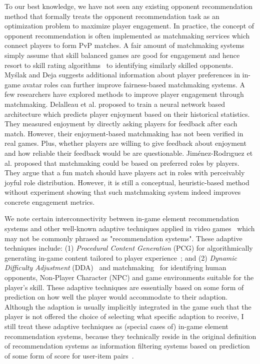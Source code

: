 To our best knowledge, we have not seen any existing opponent recommendation method that formally treats the opponent recommendation task as an optimization problem to maximize player engagement. In practice, the concept of opponent recommendation is often implemented as matchmaking services which connect players to form PvP matches. A fair amount of matchmaking systems simply assume that skill balanced games are good for engagement \cite{graepel2006ranking,sweetser2005gameflow,flow1990psychology,chen2007flow} and hence resort to skill rating algorithms~\cite{glickman1999parameter,elo1978rating,herbrich:trueskill} to identifying similarly skilled opponents. My\'{s}lak and Deja \cite{myslak2014developing} suggests additional information about player preferences in in-game avatar roles can further improve fairness-based matchmaking systems. A few researchers have explored methods to improve player engagement through matchmaking. Delalleau et al. \cite{Delalleau2012} proposed to train a neural network based architecture which predicts player enjoyment based on their historical statistics. They measured enjoyment by directly asking players for feedback after each match. However, their enjoyment-based matchmaking has not been verified in real games. Plus, whether players are willing to give feedback about enjoyment and how reliable their feedback would be are questionable. Jim{\'e}nez-Rodr{\i}guez et al. \cite{jimenez2011matchmaking} proposed that matchmaking could be based on preferred roles by players. They argue that a fun match should have players act in  roles with perceivably joyful role distribution. However, it is still a conceptual, heuristic-based method without experiment showing that such matchmaking system indeed improves concrete engagement metrics.

We note certain interconnectivity between in-game element recommendation systems and other well-known adaptive techniques applied in video games~\cite{bakkes2012personalised,chen2015analytics} which may not be commonly phrased as "recommendation systems". These adaptive techniques include: (1) \textit{Procedural Content Generation} (PCG) for algorithmically generating in-game content tailored to player experience~\cite{yannakakis2011experience,togelius2011search}; and (2) \textit{Dynamic Difficulty Adjustment} (DDA)~\cite{hunicke2005case} and matchmaking~\cite{Delalleau2012,herbrich:trueskill} for identifying human opponents, Non-Player Character (NPC) and game environments suitable for the player's skill. These adaptive techniques are essentially based on some form of prediction on how well the player would accommodate to their adaption. Although the adaption is usually implicitly integrated in the game such that the player is not offered the choice of selecting what specific adaption to receive, I still treat these adaptive techniques as (special cases of) in-game element recommendation systems, because they technically reside in the original definition of recommendation systems as information filtering systems based on prediction of some form of score for user-item pairs~\cite{isinkaye2015recommendation,bobadilla2013recommender,resnick1997recommender,adomavicius2005toward}. 

